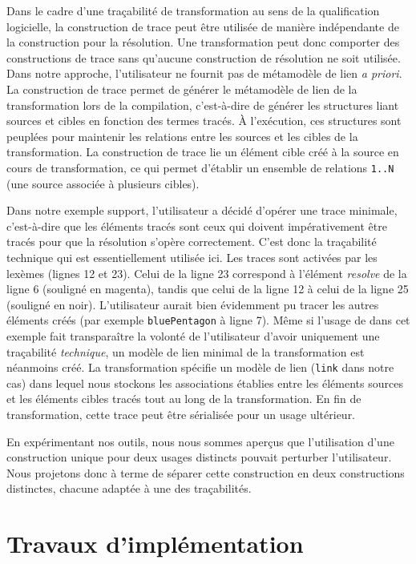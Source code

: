 Dans le cadre d'une traçabilité de transformation au sens de la qualification
logicielle, la construction de trace peut être utilisée de manière indépendante
de la construction pour la résolution. Une transformation peut donc comporter
des constructions de trace sans qu'aucune construction de résolution ne soit
utilisée. Dans notre approche, l'utilisateur ne fournit pas de métamodèle de
lien \emph{a priori}. La construction de trace permet de générer le métamodèle
de lien de la transformation lors de la compilation, c'est-à-dire de générer
les structures liant sources et cibles en fonction des termes tracés. À
l'exécution, ces structures sont peuplées pour maintenir les relations entre
les sources et les cibles de la transformation. La construction de trace lie un
élément cible créé à la source en cours de transformation, ce qui permet
d'établir un ensemble de relations \texttt{1..N} (une source associée à
plusieurs cibles).

Dans notre exemple support, l'utilisateur a décidé d'opérer une trace minimale,
c'est-à-dire que les éléments tracés sont ceux qui doivent impérativement être
tracés pour que la résolution s'opère correctement. C'est donc la traçabilité
technique qui est essentiellement utilisée ici. Les traces sont activées par
les lexèmes  (lignes 12 et 23). Celui de la ligne 23
correspond à l'élément \emph{resolve} de la ligne 6 (souligné en magenta),
tandis que celui de la ligne 12 à celui de la ligne 25 (souligné en noir).
L'utilisateur aurait bien évidemment pu tracer les autres éléments créés (par
exemple \texttt{bluePentagon} à ligne 7). Même si l'usage de 
dans cet exemple fait transparaître la volonté de l'utilisateur d'avoir
uniquement une traçabilité \emph{technique}, un modèle de lien minimal de la
transformation est néanmoins créé. La transformation spécifie un modèle de lien
(\texttt{link} dans notre cas) dans lequel nous stockons les associations
établies entre les éléments sources et les éléments cibles tracés tout au long
de la transformation. En fin de transformation, cette trace peut être
sérialisée pour un usage ultérieur.

En expérimentant nos outils, nous nous sommes aperçus que l'utilisation d'une
construction unique pour deux usages distincts pouvait perturber l'utilisateur.
Nous projetons donc à terme de séparer cette construction en deux constructions
distinctes, chacune adaptée à une des traçabilités.


\section{Travaux d'implémentation}

